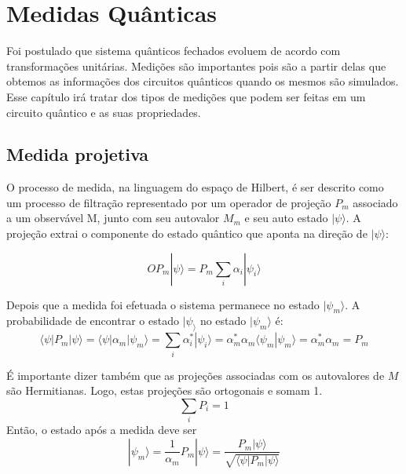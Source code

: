 \documentclass[tcc,capa]{texufpel}
\begin{document}
\chapter{Medidas Quânticas}\label{cap:medidas}
Foi postulado que sistema quânticos fechados evoluem de acordo com transformações unitárias. Medições são importantes pois são a partir delas que obtemos as informações dos circuitos quânticos quando os mesmos são simulados. Esse capítulo irá tratar dos tipos de medições que podem ser feitas em um circuito quântico e as suas propriedades.

\section{Medida projetiva}
O processo de medida, na linguagem do espaço de Hilbert, é ser descrito como um processo de filtração representado por um operador de projeção $P_m$ associado a um observável M, junto com seu autovalor $M_m$ e seu auto estado $|\psi\rangle$. A projeção extrai o componente do estado quântico que aponta na direção de $|\psi\rangle$:

\begin{equation}O 
    P_m|\psi\rangle= P_m\sum\limits_{i}\alpha_i|\psi_i\rangle
\end{equation}

Depois que a medida foi efetuada o sistema permanece no estado $|\psi_m\rangle$.
A probabilidade de encontrar o estado $|\psi_\rangle$ no estado $|\psi_m\rangle$ é:
\begin{equation}
    \langle\psi|P_m|\psi\rangle= \langle\psi|\alpha_m|\psi_m\rangle 
    =\sum\limits_{i}\alpha_i^*|\psi_i\rangle
    =\alpha_m^*\alpha_m\langle\psi_m|\psi_m\rangle
    =\alpha_m^*\alpha_m=P_m
\end{equation}

É importante dizer também que as projeções associadas com os autovalores de $M$ são Hermitianas. Logo, estas projeções são ortogonais e somam 1.
\begin{equation}
    \sum\limits_{i}P_i=1
\end{equation}
Então, o estado após a medida deve ser 
\begin{equation}
    |\psi_m\rangle= \frac{1}{\alpha_m}P_m|\psi\rangle =
    \frac{P_m|\psi\rangle}{\sqrt{\langle\psi|P_m|\psi\rangle}}
\end{equation}
\end{document}
